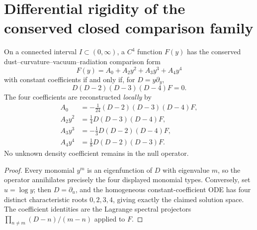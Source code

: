\documentclass[12pt,a4paper]{article}
\begin{document}
\section{Differential rigidity of the conserved closed comparison family}
\label{p9:sec:cc14-kinematic-rigidity}
\begin{theorem}
\label{p9:thm:cc14-kinematic-euler}
On a connected interval $I\subset(0,\infty)$, a $C^4$ function
$F(y)$ has the conserved dust--curvature--vacuum--radiation
comparison form
\[
 F(y)=A_0+A_2y^2+A_3y^3+A_4y^4
\]
with constant coefficients if and only if, for $D=y\partial_y$,
\[
 \boxed{D(D-2)(D-3)(D-4)F=0.}
\]
The four coefficients are reconstructed \emph{locally} by
\[
 \boxed{\begin{aligned}
 A_0&=-\tfrac1{24}(D-2)(D-3)(D-4)F,\\
 A_2y^2&=\tfrac14D(D-3)(D-4)F,\\
 A_3y^3&=-\tfrac13D(D-2)(D-4)F,\\
 A_4y^4&=\tfrac18D(D-2)(D-3)F.
 \end{aligned}}
\]
No unknown density coefficient remains in the null operator.
\end{theorem}
\begin{proof}
Every monomial $y^m$ is an eigenfunction of $D$ with eigenvalue
$m$, so the operator annihilates precisely the four displayed
monomial types.  Conversely, set $u=\log y$; then
$D=\partial_u$, and the homogeneous constant-coefficient ODE has
four distinct characteristic roots $0,2,3,4$, giving exactly the
claimed solution space.  The coefficient identities are the
Lagrange spectral projectors
$\prod_{n\ne m}(D-n)/(m-n)$ applied to $F$.
\end{proof}
\end{document}

